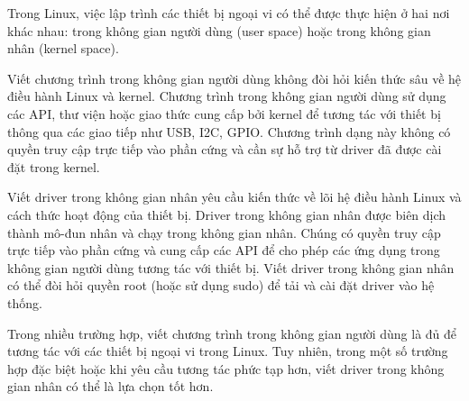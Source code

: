 Trong Linux, việc lập trình các thiết bị ngoại vi có thể được thực hiện ở hai nơi khác nhau: trong không gian người dùng (user space) hoặc trong không gian nhân (kernel space). 

Viết chương trình trong không gian người dùng không đòi hỏi kiến thức sâu về hệ điều hành Linux và kernel. Chương trình trong không gian người dùng sử dụng các API, thư viện hoặc giao thức cung cấp bởi kernel để tương tác với thiết bị thông qua các giao tiếp như USB, I2C, GPIO. Chương trình dạng này không có quyền truy cập trực tiếp vào phần cứng và cần sự hỗ trợ từ driver đã được cài đặt trong kernel.

Viết driver trong không gian nhân yêu cầu kiến thức về lõi hệ điều hành Linux và cách thức hoạt động của thiết bị.
Driver trong không gian nhân được biên dịch thành mô-đun nhân và chạy trong không gian nhân. Chúng có quyền truy cập trực tiếp vào phần cứng và cung cấp các API để cho phép các ứng dụng trong không gian người dùng tương tác với thiết bị.
Viết driver trong không gian nhân có thể đòi hỏi quyền root (hoặc sử dụng sudo) để tải và cài đặt driver vào hệ thống.

Trong nhiều trường hợp, viết chương trình trong không gian người dùng là đủ để tương tác với các thiết bị ngoại vi trong Linux. Tuy nhiên, trong một số trường hợp đặc biệt hoặc khi yêu cầu tương tác phức tạp hơn, viết driver trong không gian nhân có thể là lựa chọn tốt hơn.
